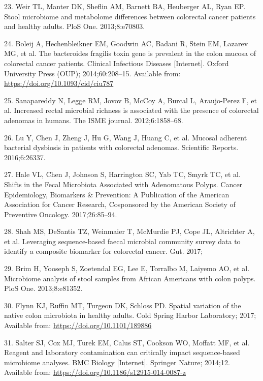 \documentclass[12pt,]{article}
\begin{document}
\hypertarget{ref-weir_stool_2013}{}
23. Weir TL, Manter DK, Sheflin AM, Barnett BA, Heuberger AL, Ryan EP.
Stool microbiome and metabolome differences between colorectal cancer
patients and healthy adults. PloS One. 2013;8:e70803.

\hypertarget{ref-bfrag_Boleij_2014}{}
24. Boleij A, Hechenbleikner EM, Goodwin AC, Badani R, Stein EM, Lazarev
MG, et al. The bacteroides fragilis toxin gene is prevalent in the colon
mucosa of colorectal cancer patients. Clinical Infectious Diseases
{[}Internet{]}. Oxford University Press (OUP); 2014;60:208--15.
Available from: \url{https://doi.org/10.1093/cid/ciu787}

\hypertarget{ref-sanapareddy_increased_2012}{}
25. Sanapareddy N, Legge RM, Jovov B, McCoy A, Burcal L, Araujo-Perez F,
et al. Increased rectal microbial richness is associated with the
presence of colorectal adenomas in humans. The ISME journal.
2012;6:1858--68.

\hypertarget{ref-lu_mucosal_2016}{}
26. Lu Y, Chen J, Zheng J, Hu G, Wang J, Huang C, et al. Mucosal
adherent bacterial dysbiosis in patients with colorectal adenomas.
Scientific Reports. 2016;6:26337.

\hypertarget{ref-hale_shifts_2017}{}
27. Hale VL, Chen J, Johnson S, Harrington SC, Yab TC, Smyrk TC, et al.
Shifts in the Fecal Microbiota Associated with Adenomatous Polyps.
Cancer Epidemiology, Biomarkers \& Prevention: A Publication of the
American Association for Cancer Research, Cosponsored by the American
Society of Preventive Oncology. 2017;26:85--94.

\hypertarget{ref-shah_leveraging_2017}{}
28. Shah MS, DeSantis TZ, Weinmaier T, McMurdie PJ, Cope JL, Altrichter
A, et al. Leveraging sequence-based faecal microbial community survey
data to identify a composite biomarker for colorectal cancer. Gut. 2017;

\hypertarget{ref-brim_microbiome_2013}{}
29. Brim H, Yooseph S, Zoetendal EG, Lee E, Torralbo M, Laiyemo AO, et
al. Microbiome analysis of stool samples from African Americans with
colon polyps. PloS One. 2013;8:e81352.

\hypertarget{ref-Flynn_preprint_2017}{}
30. Flynn KJ, Ruffin MT, Turgeon DK, Schloss PD. Spatial variation of
the native colon microbiota in healthy adults. Cold Spring Harbor
Laboratory; 2017; Available from: \url{https://doi.org/10.1101/189886}

\hypertarget{ref-Salter_contamination_2014}{}
31. Salter SJ, Cox MJ, Turek EM, Calus ST, Cookson WO, Moffatt MF, et
al. Reagent and laboratory contamination can critically impact
sequence-based microbiome analyses. BMC Biology {[}Internet{]}. Springer
Nature; 2014;12. Available from:
\url{https://doi.org/10.1186/s12915-014-0087-z}
\end{document}

